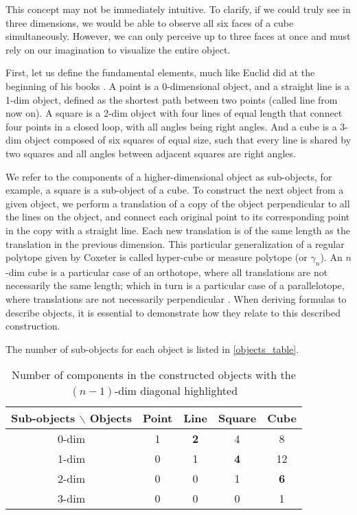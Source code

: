 \documentclass{article}
\begin{document}
	This concept may not be immediately intuitive. To clarify, if we could truly see in three dimensions, we would be able to observe all six faces of a cube simultaneously. However, we can only perceive up to three faces at once and must rely on our imagination to visualize the entire object.
	
	First, let us define the fundamental elements, much like Euclid did at the beginning of his books \cite{euclid}. A point is a 0-dimensional object, and a straight line is a 1-dim object, defined as the shortest path between two points (called line from now on). A square is a 2-dim object with four lines of equal length that connect four points in a closed loop, with all angles being right angles. And a cube is a 3-dim object composed of six squares of equal size, such that every line is shared by two squares and all angles between adjacent squares are right angles.

	We refer to the components of a higher-dimensional object as sub-objects, for example, a square is a sub-object of a cube. To construct the next object from a given object, we perform a translation of a copy of the object perpendicular to all the lines on the object, and connect each original point to its corresponding point in the copy with a straight line. Each new translation is of the same length as the translation in the previous dimension. This particular generalization of a regular polytope given by Coxeter \cite{coxeter1973regular} is called hyper-cube or measure polytope (or $\gamma_n$). An $n$-dim cube is a particular case of an orthotope, where all translations are not necessarily the same length; which in turn is a particular case of a parallelotope, where translations are not necessarily perpendicular \cite{coxeter1973regular}. When deriving formulas to describe objects, it is essential to demonstrate how they relate to this described construction.
	
	The number of sub-objects for each object is listed in \autoref{objects_table}.

	\begin{table}[ht]
		\centering
		\begin{tabular}{||c | c c c c||}
			\hline
			Sub-objects $\backslash$ Objects & Point & Line & Square & Cube\\\hline\hline
			0-dim & 1 & \textbf{2} & 4 & 8\\\hline
			1-dim & 0 & 1 & \textbf{4} & 12\\\hline
			2-dim & 0 & 0 & 1 & \textbf{6}\\\hline
			3-dim & 0 & 0 & 0 & 1\\\hline
		\end{tabular}
		\caption{Number of components in the constructed objects with the $(n-1)$-dim diagonal highlighted \cite{coxeter1973regular}}
		\label{objects_table}
	\end{table}
	
\end{document}
